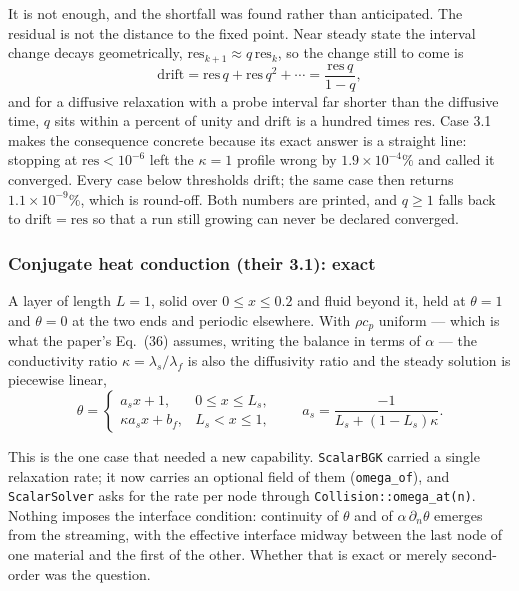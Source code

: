 \documentclass[11pt,a4paper]{article}
\begin{document}
It is not enough, and the shortfall was found rather than anticipated. The
residual is not the distance to the fixed point. Near steady state the interval
change decays geometrically, $\mathrm{res}_{k+1} \approx q\,\mathrm{res}_k$, so
the change still to come is
\begin{equation}
  \mathrm{drift} = \mathrm{res}\,q + \mathrm{res}\,q^2 + \cdots
                 = \frac{\mathrm{res}\,q}{1-q},
\end{equation}
and for a diffusive relaxation with a probe interval far shorter than the
diffusive time, $q$ sits within a percent of unity and $\mathrm{drift}$ is a
hundred times $\mathrm{res}$. Case 3.1 makes the consequence concrete because its
exact answer is a straight line: stopping at $\mathrm{res} < 10^{-6}$ left the
$\kappa=1$ profile wrong by $1.9\times10^{-4}\%$ and called it converged. Every
case below thresholds $\mathrm{drift}$; the same case then returns
$1.1\times10^{-9}\%$, which is round-off. Both numbers are printed, and $q\ge1$
falls back to $\mathrm{drift}=\mathrm{res}$ so that a run still growing can never
be declared converged.

\subsubsection{Conjugate heat conduction (their 3.1): exact}

A layer of length $L=1$, solid over $0\le x\le 0.2$ and fluid beyond it, held at
$\theta=1$ and $\theta=0$ at the two ends and periodic elsewhere. With
$\rho c_p$ uniform --- which is what the paper's Eq.~(36) assumes, writing the
balance in terms of $\alpha$ --- the conductivity ratio $\kappa=\lambda_s/\lambda_f$
is also the diffusivity ratio and the steady solution is piecewise linear,
\begin{equation}
  \theta = \begin{cases} a_s x + 1, & 0\le x \le L_s,\\
                         \kappa a_s x + b_f, & L_s < x \le 1,\end{cases}
  \qquad a_s = \frac{-1}{L_s + (1-L_s)\kappa}.
\end{equation}

This is the one case that needed a new capability. \verb|ScalarBGK| carried a
single relaxation rate; it now carries an optional field of them
(\verb|omega_of|), and \verb|ScalarSolver| asks for the rate per node through
\verb|Collision::omega_at(n)|. Nothing imposes the interface condition:
continuity of $\theta$ and of $\alpha\,\partial_n\theta$ emerges from the
streaming, with the effective interface midway between the last node of one
material and the first of the other. Whether that is exact or merely
second-order was the question.
\end{document}
